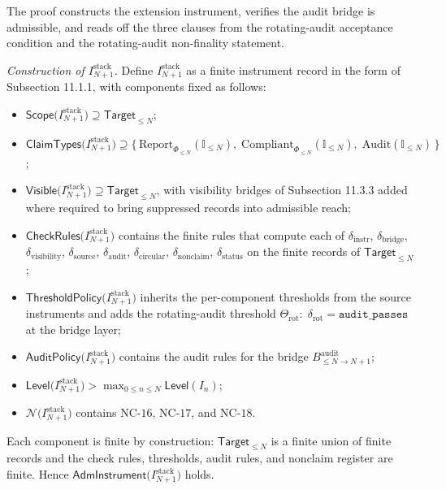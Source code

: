 \documentclass[11pt]{article}
\providecommand{\tightlist}{}
\theoremstyle{definition}
\begin{document}
The proof constructs the extension instrument, verifies the audit bridge is admissible, and reads off the three clauses from the rotating-audit acceptance condition and the rotating-audit non-finality statement.

\emph{Construction of \(I_{N+1}^{\mathrm{stack}}\).} Define \(I_{N+1}^{\mathrm{stack}}\) as a finite instrument record in the form of Subsection 11.1.1, with components fixed as follows:

\begin{itemize}
\tightlist
\item
  \(\mathsf{Scope}\bigl(I_{N+1}^{\mathrm{stack}}\bigr)\supseteq\mathsf{Target}_{\le N}\);
\item
  \(\mathsf{ClaimTypes}\bigl(I_{N+1}^{\mathrm{stack}}\bigr)\supseteq\{\,\mathrm{Report}_{\Phi_{\le N}}(\mathbb I_{\le N}),\;\mathrm{Compliant}_{\Phi_{\le N}}(\mathbb I_{\le N}),\;\mathrm{Audit}(\mathbb I_{\le N})\,\}\);
\item
  \(\mathsf{Visible}\bigl(I_{N+1}^{\mathrm{stack}}\bigr)\supseteq\mathsf{Target}_{\le N}\), with visibility bridges of Subsection 11.3.3 added where required to bring suppressed records into admissible reach;
\item
  \(\mathsf{CheckRules}\bigl(I_{N+1}^{\mathrm{stack}}\bigr)\) contains the finite rules that compute each of \(\delta_{\mathrm{instr}}\), \(\delta_{\mathrm{bridge}}\), \(\delta_{\mathrm{visibility}}\), \(\delta_{\mathrm{source}}\), \(\delta_{\mathrm{audit}}\), \(\delta_{\mathrm{circular}}\), \(\delta_{\mathrm{nonclaim}}\), \(\delta_{\mathrm{status}}\) on the finite records of \(\mathsf{Target}_{\le N}\);
\item
  \(\mathsf{ThresholdPolicy}\bigl(I_{N+1}^{\mathrm{stack}}\bigr)\) inherits the per-component thresholds from the source instruments and adds the rotating-audit threshold \(\Theta_{\mathrm{rot}}:\;\delta_{\mathrm{rot}}=\texttt{audit\_passes}\) at the bridge layer;
\item
  \(\mathsf{AuditPolicy}\bigl(I_{N+1}^{\mathrm{stack}}\bigr)\) contains the audit rules for the bridge \(B^{\mathrm{audit}}_{\le N\to N+1}\);
\item
  \(\mathsf{Level}\bigl(I_{N+1}^{\mathrm{stack}}\bigr)>\max_{0\le n\le N}\mathsf{Level}(I_n)\);
\item
  \(\mathcal N\bigl(I_{N+1}^{\mathrm{stack}}\bigr)\) contains \(\mathrm{NC}\text{-}16\), \(\mathrm{NC}\text{-}17\), and \(\mathrm{NC}\text{-}18\).
\end{itemize}

Each component is finite by construction: \(\mathsf{Target}_{\le N}\) is a finite union of finite records and the check rules, thresholds, audit rules, and nonclaim register are finite. Hence \(\mathsf{AdmInstrument}\bigl(I_{N+1}^{\mathrm{stack}}\bigr)\) holds.
\end{document}
